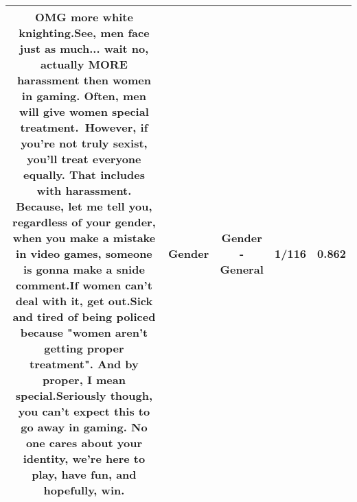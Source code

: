 \documentclass[11pt]{article}
\newlength\mylength
\begin{document}
\begin{center}
\begin{longtable}{|C{.65\mylength}|C{.30\mylength}|C{.12\mylength}|C{.12\mylength}|C{.12\mylength}|}
  \small OMG more white knighting.See, men face just as much... wait no, actually MORE harassment then women in gaming. Often, men will give women special treatment. However, if you're not truly sexist, you'll treat everyone equally. That includes with harassment. Because, let me tell you, regardless of your \textbf{gender}, when you make a mistake in video games, someone is gonna make a snide comment.If women can't deal with it, get out.Sick and tired of being policed because "women aren't getting proper treatment". And by proper, I mean special.Seriously though, you can't expect this to go away in gaming. No one cares about your identity, we're here to play, have fun, and hopefully, win.\normalsize   & Gender & Gender - General & 1/116 & 0.862 \\  \hline

\end{longtable}
\end{center}
\end{document}
